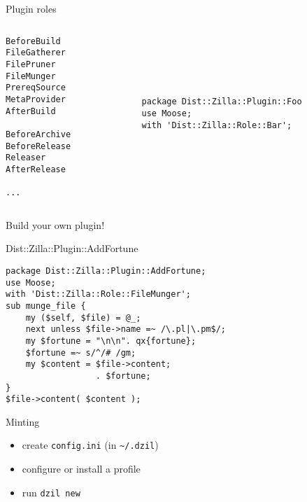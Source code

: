 \documentclass[serif,14pt,color=usenames,dvipsnames]{beamer}
\begin{document}
\begin{frame}[fragile]{Plugin roles}
\begin{columns}[t]
\begin{column}{.3\textwidth}
\begin{overprint}
\begin{verbatim}
BeforeBuild
FileGatherer
FilePruner
FileMunger
PrereqSource
MetaProvider
AfterBuild

BeforeArchive
BeforeRelease
Releaser
AfterRelease

...
\end{verbatim}
\end{overprint}
\end{column}
\begin{column}{.7\textwidth}
\begin{overprint}
~\\
~\\
\begin{block}{~}
\begin{verbatim}
package Dist::Zilla::Plugin::Foo
use Moose;
with 'Dist::Zilla::Role::Bar';
\end{verbatim}
\end{block}
\end{overprint}
\end{column}
\end{columns}
\end{frame}

{ %
\begin{frame}{Build your own plugin!}
\end{frame}}

\begin{frame}[fragile]{Dist::Zilla::Plugin::AddFortune}
\begin{verbatim}
package Dist::Zilla::Plugin::AddFortune;
use Moose;
with 'Dist::Zilla::Role::FileMunger';
sub munge_file {
    my ($self, $file) = @_;
    next unless $file->name =~ /\.pl|\.pm$/;
    my $fortune = "\n\n". qx{fortune};
    $fortune =~ s/^/# /gm;
    my $content = $file->content;
                  . $fortune;
}
$file->content( $content );
\end{verbatim}
\end{frame}

\begin{frame}[fragile]{Minting}
\begin{itemize}
	\item create \texttt{config.ini} (in \verb|~/.dzil|)
	\item configure or install a profile
	\item run \texttt{dzil new} 
\end{itemize}
\end{frame}
\end{document}
